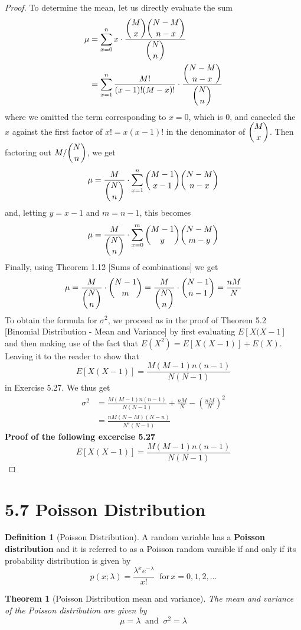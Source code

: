 \documentclass[
10pt,reqno
]{amsart}
\newtheorem{theorem}{Theorem}[section]
\theoremstyle{definition}
\newtheorem{definition}{Definition}[section]
\begin{document}
\begin{proof}
To determine the mean, let us directly evaluate the sum
\begin{align*}
\mu &= \sum_{x=0}^n x \cdot \frac {\dbinom M x \dbinom {N-M} {n-x}}{\dbinom N n}\\
&=\sum_{x=1}^n \frac{M!}{(x-1)!(M-x)!} \cdot \frac {\dbinom {N-M} {n-x}}{\dbinom N n}
\end{align*}
where we omitted the term corresponding to \(x=0\), which is 0, and canceled the \(x\) against the first factor of \(x!=x(x-1)!\) in the denominator of \(\dbinom M x\). Then factoring out \(M/\dbinom N n\), we get
\[
\mu = \frac{M}{\dbinom N n} \cdot \sum_{x=1}^n \dbinom {M-1} {x-1} \dbinom {N-M}{n-x}
\]
and, letting \(y=x-1\) and \(m=n-1\), this becomes
\[
\mu = \frac{M}{\dbinom N n} \cdot \sum_{x=0}^m \dbinom {M-1} {y} \dbinom {N-M}{m-y}
\]
Finally, using Theorem 1.12 [Sums of combinations] we get 
\[
\mu = \frac{M}{\dbinom N n} \cdot \dbinom {N-1} {m} = \frac{M}{\dbinom N n} \cdot \dbinom {N-1} {n-1}= \frac{nM}{N}
\]
To obtain the formula for \(\sigma^2\), we proceed as in the proof of Theorem 5.2 [Binomial Distribution - Mean and Variance] by first evaluating \(E[X(X-1]\) and then making use of the fact that \(E(X^2)=E[X(X-1)]+E(X)\). 
Leaving it to the reader to show that 
\[
E[X(X-1)]=\frac{M(M-1)n(n-1)}{N(N-1)}
\]
in Exercise 5.27. We thus get
\begin{align*}
\sigma^2 & =\frac{M(M-1)n(n-1)}{N(N-1)} + \frac{nM}{N} - \left ( \frac{nM}{N} \right )^2 \\
&=\frac{nM(N-M)(N-n)}{N^2(N-1)}
\end{align*}
\textbf{Proof of the following excercise 5.27}
\[
E[X(X-1)]=\frac{M(M-1)n(n-1)}{N(N-1)}
\]
\end{proof}

\section*{5.7 Poisson Distribution}

\begin{definition}[Poisson Distribution]
\label{dfn:PoissonDistr}
A random variable has a \textbf{Poisson distribution} and it is referred to as a Poisson random varaible if and only if its probability distribution is given by
\[
p(x;\lambda) = \frac{\lambda^x e^{-\lambda}}{x!} \;\; \text{for} \, x=0,1,2,\dots
\]
\end{definition}

\begin{theorem}[Poisson Distribution mean and variance]
The mean and variance of the Poisson distribution are given by 
\[
\mu = \lambda \;\; \text{and} \;\; \sigma^2=\lambda
\]
\end{theorem}
\end{document}
